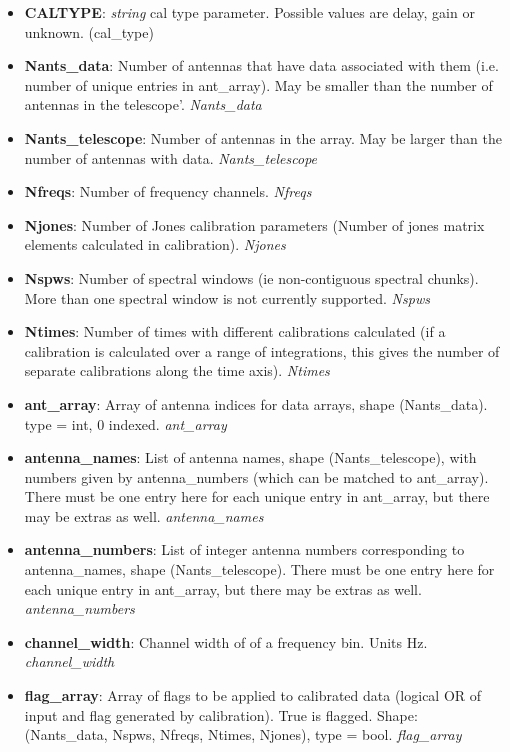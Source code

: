 \documentclass[11pt, oneside]{article}   	%
\begin{document}
\begin{itemize}
\item{\textbf{CALTYPE}: \emph{string} cal type parameter. Possible values are delay, gain or
    unknown. (cal\_type)}
\item{\textbf{Nants\_data}: Number of antennas that have data associated with them 
    (i.e. number of unique entries in ant\_array). May be smaller than the number of 
    antennas in the telescope'. \emph{Nants\_data}}
\item{\textbf{Nants\_telescope}: Number of antennas in the array. May be larger
    than the number of antennas with data. \emph{Nants\_telescope}}
\item{\textbf{Nfreqs}: Number of frequency channels. \emph{Nfreqs}}
\item{\textbf{Njones}: Number of Jones calibration parameters (Number of
    jones matrix elements calculated in calibration). \emph{Njones}}
\item{\textbf{Nspws}: Number of spectral windows (ie non-contiguous spectral
    chunks). More than one spectral window is not currently supported. \emph{Nspws}}
\item{\textbf{Ntimes}: Number of times with different calibrations calculated
    (if a calibration is calculated over a range of integrations, this gives the
    number of separate calibrations along the time axis). \emph{Ntimes}}
\item{\textbf{ant\_array}: Array of antenna indices for data arrays, shape
    (Nants\_data). type = int, 0 indexed. \emph{ant\_array}}
\item{\textbf{antenna\_names}: List of antenna names, shape (Nants\_telescope),
    with numbers given by antenna\_numbers (which can be matched to ant\_array).
    There must be one entry here for each unique entry in ant\_array, but there may be extras as well. \emph{antenna\_names}}
\item{\textbf{antenna\_numbers}: List of integer antenna numbers corresponding
    to antenna\_names, shape (Nants\_telescope). There must be one entry here for each unique entry in ant\_array, but there may be extras as well. \emph{antenna\_numbers}}
\item{\textbf{channel\_width}: Channel width of of a frequency bin. Units Hz. \emph{channel\_width}}
\item{\textbf{flag\_array}: Array of flags to be applied to calibrated data
    (logical OR of input and flag generated by calibration). True is flagged.
    Shape: (Nants\_data, Nspws, Nfreqs, Ntimes, Njones), type = bool. \emph{flag\_array}}

\end{itemize}
\end{document}
